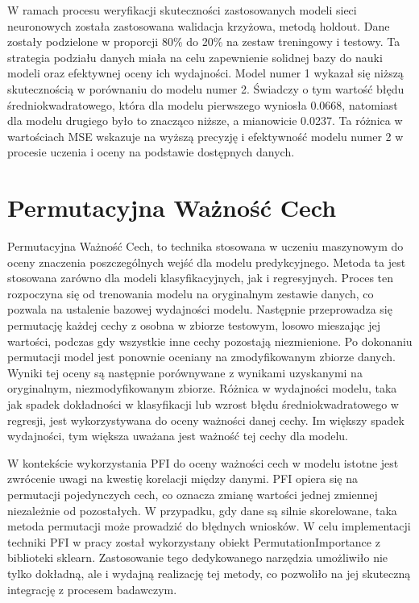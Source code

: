 \documentclass[a4paper,twoside,12pt]{book}
\begin{document}
W ramach procesu weryfikacji skuteczności zastosowanych modeli sieci neuronowych została zastosowana walidacja krzyżowa, metodą holdout. Dane zostały podzielone w proporcji 80\% do 20\% na zestaw treningowy i testowy. Ta strategia podziału danych miała na celu zapewnienie solidnej bazy do nauki modeli oraz efektywnej oceny ich wydajności. Model numer 1 wykazał się niższą skutecznością w porównaniu do modelu numer 2. Świadczy o tym wartość błędu średniokwadratowego, która dla modelu pierwszego wyniosła 0.0668, natomiast dla modelu drugiego było to znacząco niższe, a mianowicie 0.0237. Ta różnica w wartościach MSE wskazuje na wyższą precyzję i efektywność modelu numer 2 w procesie uczenia i oceny na podstawie dostępnych danych.
\newpage
\section{Permutacyjna Ważność Cech}
Permutacyjna Ważność Cech, to technika stosowana w uczeniu maszynowym do oceny znaczenia poszczególnych wejść dla modelu predykcyjnego. Metoda ta jest stosowana zarówno dla modeli klasyfikacyjnych, jak i regresyjnych. Proces ten rozpoczyna się od trenowania modelu na oryginalnym zestawie danych, co pozwala na ustalenie bazowej wydajności modelu. Następnie przeprowadza się permutację każdej cechy z osobna w zbiorze testowym, losowo mieszając jej wartości, podczas gdy wszystkie inne cechy pozostają niezmienione. Po dokonaniu permutacji model jest ponownie oceniany na zmodyfikowanym zbiorze danych. Wyniki tej oceny są następnie porównywane z wynikami uzyskanymi na oryginalnym, niezmodyfikowanym zbiorze. Różnica w wydajności modelu, taka jak spadek dokładności w klasyfikacji lub wzrost błędu średniokwadratowego w regresji, jest wykorzystywana do oceny ważności danej cechy. Im większy spadek wydajności, tym większa uważana jest ważność tej cechy dla modelu.

W kontekście wykorzystania PFI do oceny ważności cech w modelu istotne jest zwrócenie uwagi na kwestię korelacji między danymi. PFI opiera się na permutacji pojedynczych cech, co oznacza zmianę wartości jednej zmiennej niezależnie od pozostałych. W przypadku, gdy dane są silnie skorelowane, taka metoda permutacji może prowadzić do błędnych wniosków. W celu implementacji techniki PFI w pracy został wykorzystany obiekt PermutationImportance z biblioteki sklearn. Zastosowanie tego dedykowanego narzędzia umożliwiło nie tylko dokładną, ale i wydajną realizację tej metody, co pozwoliło na jej skuteczną integrację z procesem badawczym.
\end{document}
